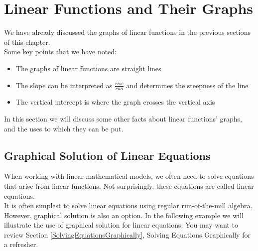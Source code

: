 
%
%

\section{Linear Functions and Their Graphs}
\label{LinearFunctionsGraphs}

We have already discussed the graphs of linear functions in the previous sections of this chapter.\\

Some key points that we have noted:

\begin{itemize}
	\item The graphs of linear functions are straight lines
	\item The slope can be interpreted as $\frac{rise}{run}$ and determines the steepness of the line
	\item The vertical intercept is where the graph crosses the vertical axis
\end{itemize}

In this section we will discuss some other facts about linear functions’ graphs, and the uses to which they can be put.

%
%

\subsection{Graphical Solution of Linear Equations}

When working with linear mathematical models, we often need to solve equations that arise from linear functions. Not surprisingly, these equations are called linear equations.\\

It is often simplest to solve linear equations using regular run-of-the-mill algebra. However, graphical solution is also an option. In the following example we will illustrate the use of graphical
solution for linear equations. You may want to review Section \ref{SolvingEquationsGraphically}, Solving Equations Graphically for a refresher.


